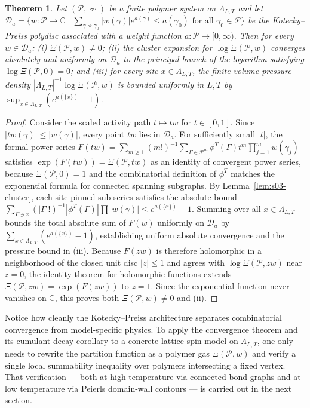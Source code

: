 \documentclass[11pt]{article}
\newtheorem{theorem}{Theorem}[section]
\theoremstyle{definition}
\begin{document}
\begin{theorem}
\label{thm:s03-cluster-conv}
Let $(\mathcal{P}, \not\sim)$ be a finite polymer system on $\Lambda_{L,T}$ and let
$\mathcal{D}_a = \{w : \mathcal{P} \to \mathbb{C} \mid \sum_{\gamma \not\sim
\gamma_0} |w(\gamma)| e^{a(\gamma)} \le a(\gamma_0) \text{ for all } \gamma_0 \in
\mathcal{P}\}$ be the Kotecky--Preiss polydisc associated with a weight function $a
: \mathcal{P} \to [0, \infty)$. Then for every $w \in \mathcal{D}_a$: (i)
$\Xi(\mathcal{P}, w) \neq 0$; (ii) the cluster expansion for $\log \Xi(\mathcal{P},
w)$ converges absolutely and uniformly on $\mathcal{D}_a$ to the principal branch of
the logarithm satisfying $\log \Xi(\mathcal{P}, 0) = 0$; and (iii) for every site $x
\in \Lambda_{L,T}$, the finite-volume pressure density $|\Lambda_{L,T}|^{-1} \log
\Xi(\mathcal{P}, w)$ is bounded uniformly in $L, T$ by $\sup_{x \in \Lambda_{L,T}}
(e^{a(\{x\})} - 1)$.
\end{theorem}
\begin{proof}
Consider the scaled activity path $t \mapsto t w$ for $t \in [0, 1]$. Since $|t
w(\gamma)| \le |w(\gamma)|$, every point $t w$ lies in $\mathcal{D}_a$. For
sufficiently small $|t|$, the formal power series $F(t w) = \sum_{m \ge 1} (m!)^{-1}
\sum_{\Gamma \in \mathcal{P}^m} \phi^T(\Gamma) t^m \prod_{j=1}^m w(\gamma_j)$
satisfies $\exp(F(t w)) = \Xi(\mathcal{P}, t w)$ as an identity of convergent power
series, because $\Xi(\mathcal{P}, 0) = 1$ and the combinatorial definition of
$\phi^T$ matches the exponential formula for connected spanning subgraphs. By
Lemma~\ref{lem:s03-cluster}, each site-pinned sub-series satisfies the absolute
bound $\sum_{\Gamma \ni x} (|\Gamma|!)^{-1} |\phi^T(\Gamma)| \prod |w(\gamma)| \le
e^{a(\{x\})} - 1$. Summing over all $x \in \Lambda_{L,T}$ bounds the total absolute
sum of $F(w)$ uniformly on $\mathcal{D}_a$ by $\sum_{x \in \Lambda_{L,T}}
(e^{a(\{x\})} - 1)$, establishing uniform absolute convergence and the pressure
bound in (iii). Because $F(z w)$ is therefore holomorphic in a neighborhood of the
closed unit disc $|z| \le 1$ and agrees with $\log \Xi(\mathcal{P}, z w)$ near $z =
0$, the identity theorem for holomorphic functions extends $\Xi(\mathcal{P}, z w) =
\exp(F(z w))$ to $z = 1$. Since the exponential function never vanishes on
$\mathbb{C}$, this proves both $\Xi(\mathcal{P}, w) \neq 0$ and (ii).
\end{proof}

Notice how cleanly the Kotecky--Preiss architecture separates combinatorial
convergence from model-specific physics. To apply the convergence theorem and its
cumulant-decay corollary to a concrete lattice spin model on $\Lambda_{L,T}$, one
only needs to rewrite the partition function as a polymer gas $\Xi(\mathcal{P}, w)$
and verify a single local summability inequality over polymers intersecting a fixed
vertex. That verification --- both at high temperature via connected bond graphs and
at low temperature via Peierls domain-wall contours --- is carried out in the next
section.
\end{document}
